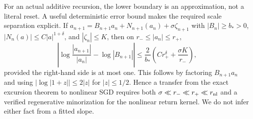 \documentclass[11pt]{article}
\theoremstyle{definition}
\begin{document}
For an actual additive recursion, the lower boundary is an approximation,
not a literal reset.  A useful deterministic error bound makes the required
scale separation explicit.  If
$a_{n+1}=B_{n+1}a_n+N_{n+1}(a_n)+\sigma\zeta_{n+1}$ with
$|B_n|\geq b_*>0$, $|N_n(a)|\leq C|a|^{1+\delta}$, and
$|\zeta_n|\leq K$, then on $r_-\leq|a_n|\leq r_+$,
\begin{equation}
 \left|
  \log\frac{|a_{n+1}|}{|a_n|}-\log|B_{n+1}|
 \right|
 \leq \frac{2}{b_*}
 \left(Cr_+^\delta+\frac{\sigma K}{r_-}\right),
 \label{eq:local-log-error-bound}
\end{equation}
provided the right-hand side is at most one.  This follows by factoring
$B_{n+1}a_n$ and using $|\log|1+z||\leq2|z|$ for $|z|\leq1/2$.
Hence a transfer from the exact excursion theorem to nonlinear SGD requires
both $\sigma\ll r_-\ll r_+\ll r_{\rm nl}$ and a verified regenerative
minorization for the nonlinear return kernel.  We do not infer either fact
from a fitted slope.
\end{document}
